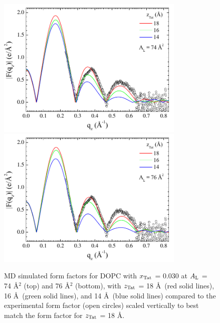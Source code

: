 \begin{figure}[p]
  \centering
  \includegraphics[width=0.8\textwidth]{figures/Tat/MD_Results/xff/dopc-tat4_74_sim-exp1}
  \includegraphics[width=0.8\textwidth]{figures/Tat/MD_Results/xff/dopc-tat4_76_sim-exp1}
  \caption{MD simulated form factors for DOPC with $x_\textrm{Tat}$ = 0.030 
  at $A_\textrm{L}$ = 74 \AA$^2$ (top) and 76 \AA$^2$ (bottom),
  with $z_\textrm{Tat}$ = 18 \AA\ (red solid lines), 16 \AA\ (green solid lines), 
  and 14 \AA\ (blue solid lines) compared to the experimental form factor 
  (open circles) scaled vertically to best match the form factor for 
  $z_\textrm{Tat}$ = 18 \AA.}
  \label{fig:MD_dopc-tat4_sim-exp}
\end{figure}

